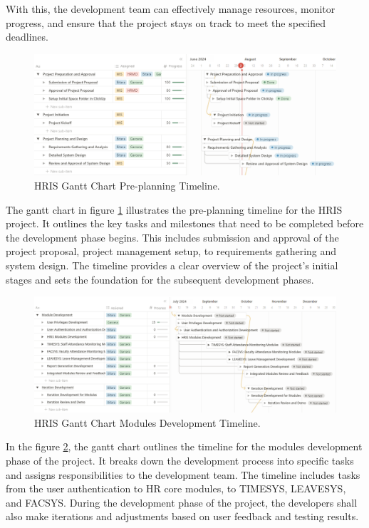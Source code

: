     With this, the development team can effectively manage resources, monitor progress, and ensure that the project stays on track to meet the specified deadlines.

    \begin{figure}[H]
        \centering
        \includegraphics[width=1\linewidth]{figures/images/gantt-chart-1.png}
        \caption{HRIS Gantt Chart Pre-planning Timeline.}
        \label{fig:gantt-chart-1}
    \end{figure}

    The gantt chart in figure \ref{fig:gantt-chart-1} illustrates the pre-planning timeline for the HRIS project. It outlines the key tasks and milestones that need to be completed before the development phase begins. This includes submission and approval of the project proposal, project management setup, to requirements gathering and system design. The timeline provides a clear overview of the project's initial stages and sets the foundation for the subsequent development phases.

    \begin{figure}[H]
        \centering
        \includegraphics[width=1\linewidth]{figures/images/gantt-chart-2.png}
        \caption{HRIS Gantt Chart Modules Development Timeline.}
        \label{fig:gantt-chart-2}
    \end{figure}

    In the figure \ref{fig:gantt-chart-2}, the gantt chart outlines the timeline for the modules development phase of the project. It breaks down the development process into specific tasks and assigns responsibilities to the development team. The timeline includes tasks from the user authentication to HR core modules, to TIMESYS, LEAVESYS, and FACSYS. During the development phase of the project, the developers shall also make iterations and adjustments based on user feedback and testing results.

